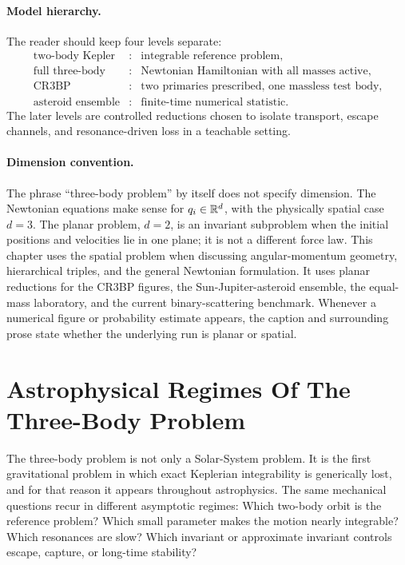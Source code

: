 \paragraph{Model hierarchy.}
The reader should keep four levels separate:
\[
\begin{array}{rcl}
\text{two-body Kepler} &:& \text{integrable reference problem},\\
\text{full three-body} &:& \text{Newtonian Hamiltonian with all masses active},\\
\text{CR3BP} &:& \text{two primaries prescribed, one massless test body},\\
\text{asteroid ensemble} &:& \text{finite-time numerical statistic}.
\end{array}
\]
The later levels are controlled reductions chosen to isolate transport, escape
channels, and resonance-driven loss in a teachable setting.

\paragraph{Dimension convention.}
The phrase ``three-body problem'' by itself does not specify dimension.  The
Newtonian equations make sense for \(q_i\in\mathbb{R}^d\), with the physically spatial
case \(d=3\).  The planar problem, \(d=2\), is an invariant subproblem when the
initial positions and velocities lie in one plane; it is not a different force
law.  This chapter uses the spatial problem when discussing angular-momentum
geometry, hierarchical triples, and the general Newtonian formulation.  It uses
planar reductions for the CR3BP figures, the Sun-Jupiter-asteroid ensemble, the
equal-mass laboratory, and the current binary-scattering benchmark. Whenever a
numerical figure or probability estimate appears, the caption and surrounding
prose state whether the underlying run is planar or spatial.

\section{Astrophysical Regimes Of The Three-Body Problem}
\label{sec:three-body-astrophysical-regimes}

The three-body problem is not only a Solar-System problem.  It is the first
gravitational problem in which exact Keplerian integrability is generically
lost, and for that reason it appears throughout astrophysics.  The same
mechanical questions recur in different asymptotic regimes: Which two-body
orbit is the reference problem?  Which small parameter makes the motion nearly
integrable?  Which resonances are slow?  Which invariant or approximate
invariant controls escape, capture, or long-time stability?

